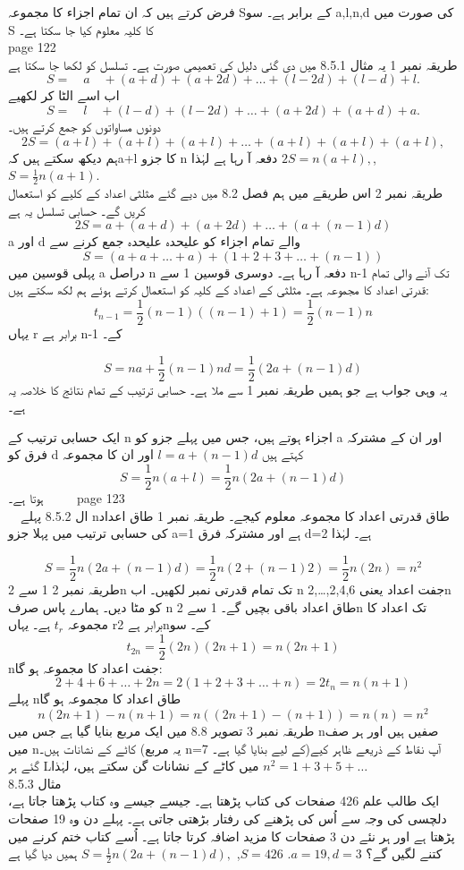 فرض کرتے ہیں کہ ان تمام اجزاء کا مجموعہ Sکے برابر ہے۔  سو  a,l,n,d کی صورت میں S کا کلیہ معلوم کیا جا سکتا ہے۔\\
\clearpage
page 122\\
طریقہ نمبر 1
یہ مثال 8.5.1 میں دی گئی دلیل کی تعمیمی صورت ہے۔ تسلسل کو لکھا جا سکتا ہے
\[S=\quad a \quad+(a+d)+(a+2d)+\dotsc+(l-2d)+(l-d)+l.\]
اب اسے الٹا کر لکھیے
\[S=\quad l \quad +(l-d)+(l-2d)+\dotsc+(a+2d)+(a+d)+a.\]
دونوں مساواتوں کو جمع کرتے ہیں۔
\[2S=(a+l)+(a+l)+(a+l)+\dotsc+(a+l)+(a+l)+(a+l),\]
ہم دیکھ سکتے ہیں کہa+l کا جزو n دفعہ آ رہا ہے لہٰذا
\(2S=n(a+l),\),
\(S=\frac{1}{2}n(a+1).\)\\
طریقہ نمبر 2
اس طریقے میں ہم فصل 8.2 میں دیے گئے مثلثی اعداد کے کلیے کو استعمال کریں گے۔ حسابی تسلسل یہ ہے
\[2S=a+(a+d)+(a+2d)+\dotsc+(a+(n-1)d)\]
a اور d والے تمام اجزاء کو علیحدہ علیحدہ جمع کرنے سے
\[S=(a+a+\dotsc+a)+(1+2+3+\dotsc+(n-1))\]
پہلی قوسین میں a دراصل n دفعہ آ رہا ہے۔ دوسری قوسین 1 سے n-1 تک آنے والی تمام قدرتی اعداد کا مجموعہ ہے۔ مثلثی کے اعداد کے کلیہ کو استعمال کرتے ہوئے ہم لکھ سکتے ہیں:
\[t_{n-1}=\frac{1}{2}(n-1)((n-1)+1)=\frac{1}{2}(n-1)n\]
یہاں r برابر ہے n-1 کے۔

\[S=na+\frac{1}{2}(n-1)nd=\frac{1}{2}(2a+(n-1)d)\]
یہ وہی جواب ہے جو ہمیں طریقہ نمبر 1 سے ملا ہے۔
حسابی ترتیب کے تمام نتائج کا خلاصہ یہ ہے۔

ایک حسابی ترتیب کے n اجزاء ہوتے ہیں، جس میں پہلے جزو کو a اور ان کے مشترکہ فرق کو d کہتے ہیں
\(l=a+(n-1)d\)
اور ان کا مجموعہ
\[S=\frac{1}{2}n(a+l)=\frac{1}{2}n(2a+(n-1)d)\]
ہوتا ہے۔
 \clearpage
 page 123\\
 ال 8.5.2
پہلے nطاق قدرتی اعداد کا مجموعہ معلوم کیجے۔
طریقہ نمبر 1
طاق اعداد کی حسابی ترتیب میں پہلا جزو a=1 ہے اور مشترکہ فرق d=2 ہے۔ لہٰذا

\[S=\frac{1}{2}n(2a+(n-1)d)=\frac{1}{2}n(2+(n-1)2)=\frac{1}{2}n(2n)=n^{2}\]
طریقہ نمبر 2
1 سے 2n تک تمام قدرتی نمبر لکھیں۔ اب n جفت اعداد یعنی 2,4,6,…,2n کو مٹا دیں۔ ہمارے پاس صرف n طاق اعداد باقی بچیں گے۔
1 سے 2n تک اعداد کا مجموعہ 
\(t_{r}\)
 ہے۔ یہاں rبرابر ہے 2nکے۔ سو
\[t_{2n}=\frac{1}{2}(2n)(2n+1)=n(2n+1)\]
nجفت اعداد کا مجموعہ ہو گا:
\[2+4+6+\dotsc+2n=2(1+2+3+\dotsc+n)=2t_{n}=n(n+1)\]
پہلے nطاق اعداد کا مجموعہ ہو گا
\[n(2n+1)-n(n+1)=n((2n+1)-(n+1))=n(n)=n^{2}\]
طریقہ نمبر 3
تصویر 8.8 میں ایک مربع بنایا گیا ہے جس میں nصفیں ہیں اور ہر صف میں nکاٹے کے نشانات ہیں۔ (یہ مربع n=7 کے لیے بنایا گیا ہے۔)آپ نقاط کے ذریعے ظاہر کیے گئے ہر Lمیں کاٹے کے نشانات گن سکتے ہیں، لہٰذا
\(n^{2}=1+3+5+\dotsc\)\\
مثال 8.5.3
\\
ایک طالب علم 426 صفحات کی کتاب پڑھتا ہے۔ جیسے جیسے وہ کتاب پڑھتا جاتا ہے، دلچسی کی وجہ سے اُس کی پڑھنے کی رفتار بڑھتی جاتی ہے۔ پہلے دن وہ 19 صفحات پڑھتا ہے اور ہر نئے دن 3 صفحات کا مزید اضافہ کرتا جاتا ہے۔ اُسے کتاب ختم کرنے میں کتنے لگیں گے؟
\(a=19,d=3\).
\(S=426\),
\(S=\frac{1}{2}n(2a+(n-1)d),\)
ہمیں دیا گیا ہے


